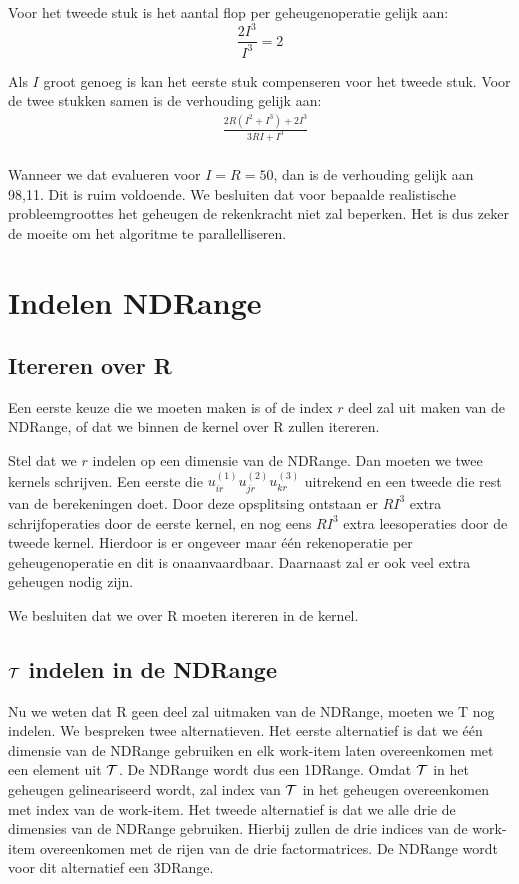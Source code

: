 Voor het tweede stuk is het aantal flop per geheugenoperatie gelijk aan:
\[
    \frac{2I^3}{I^3} = 2
\]

Als $I$ groot genoeg is kan het eerste stuk compenseren voor het tweede stuk. Voor de twee stukken samen is de verhouding gelijk aan:
\begin{align*}
    & \frac{2R (I^2 + I^3) + 2I^3}{3RI + I^3}\\
\end{align*}

Wanneer we dat evalueren voor $I = R = 50$, dan is de verhouding gelijk aan 98,11. Dit is ruim voldoende. We besluiten dat voor bepaalde realistische probleemgroottes het geheugen de rekenkracht niet zal beperken. Het is dus zeker de moeite om het algoritme te parallelliseren.

\section{Indelen NDRange}
\subsection{Itereren over R}
Een eerste keuze die we moeten maken is of de index $r$ deel zal uit maken van de NDRange, of dat we binnen de kernel over R zullen itereren.

Stel dat we $r$ indelen op een dimensie van de NDRange. Dan moeten we twee kernels schrijven. Een eerste die $u^{(1)}_{i r} u^{(2)}_{j r} u^{(3)}_{k r}$ uitrekend en een tweede die rest van de berekeningen doet. Door deze opsplitsing ontstaan er $RI^3$ extra schrijfoperaties door de eerste kernel, en nog eens $RI^3$ extra leesoperaties door de tweede kernel. Hierdoor is er ongeveer maar \'e\'en rekenoperatie per geheugenoperatie en dit is onaanvaardbaar. Daarnaast zal er ook veel extra geheugen nodig zijn.

We besluiten dat we over R moeten itereren in de kernel.

\subsection{$\mathcal{T}$ indelen in de NDRange}
Nu we weten dat R geen deel zal uitmaken van de NDRange, moeten we T nog indelen. We bespreken twee alternatieven. Het eerste alternatief is dat we \'e\'en dimensie van de NDRange gebruiken en elk work-item laten overeenkomen met een element uit $\mathcal{T}$. De NDRange wordt dus een 1DRange. Omdat $\mathcal{T}$ in het geheugen gelineariseerd wordt, zal index van $\mathcal{T}$ in het geheugen overeenkomen met index van de work-item.
Het tweede alternatief is dat we alle drie de dimensies van de NDRange gebruiken. Hierbij zullen de drie indices van de work-item overeenkomen met de rijen van de drie factormatrices. De NDRange wordt voor dit alternatief een 3DRange.


